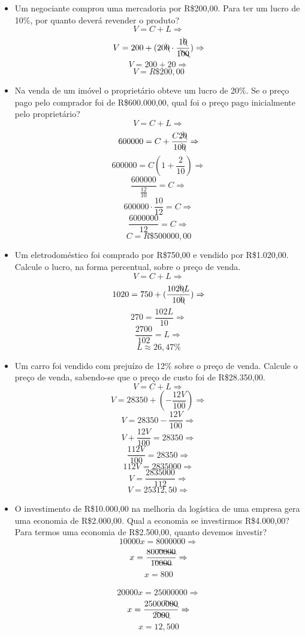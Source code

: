 \documentclass[a4paper, 12pt]{article}
\begin{document}
\begin{itemize}
\item Um negociante comprou uma mercadoria por R\$200,00. Para ter um lucro de 10\%, por quanto deverá revender o produto? \\
  $$ V = C + L \Rightarrow $$
  $$ V = 200 + (20\bcancel{0} \cdot \frac{1\bcancel{0}}{1\bcancel{00}}) \Rightarrow $$
  $$ V = 200 + 20 \Rightarrow $$
  $$ \boxed{V = R\$200,00} $$    
\item Na venda de um imóvel o proprietário obteve um lucro de 20\%. Se o preço pago pelo comprador foi de R\$600.000,00, qual foi o preço pago inicialmente pelo proprietário? \\
  $$ V = C + L \Rightarrow $$
  $$ 600000 = C + \frac{C2\bcancel{0}}{10\bcancel{0}} \Rightarrow $$  
  $$ 600000 = C \left( 1+\frac{2}{10} \right) \Rightarrow $$
  $$ \frac{600000}{\frac{12}{10}} = C \Rightarrow $$
  $$ 600000 \cdot \frac{10}{12} = C \Rightarrow $$
  $$ \frac{6000000}{12} = C \Rightarrow $$
  $$ \boxed{C = R\$500000,00} $$    
  
\item Um eletrodoméstico foi comprado por R\$750,00 e vendido por R\$1.020,00. Calcule o lucro, na forma percentual, sobre o preço de venda. \\
  $$ V = C + L \Rightarrow $$
  $$ 1020 = 750 + (\frac{102\bcancel{0}L}{10\bcancel{0}}) \Rightarrow $$
  $$ 270 = \frac{102L}{10} \Rightarrow $$
  $$ \frac{2700}{102} = L \Rightarrow $$  
  $$ \boxed{L \approx 26,47\%} $$    
  
\item Um carro foi vendido com prejuízo de 12\% sobre o preço de venda. Calcule o preço de venda, sabendo-se que o preço de custo foi de R\$28.350,00. \\
  $$ V = C + L \Rightarrow $$
  $$ V = 28350 + \left(- \frac{12V}{100} \right) \Rightarrow $$
  $$ V = 28350 - \frac{12V}{100} \Rightarrow $$
  $$ V + \frac{12V}{100} = 28350 \Rightarrow $$
  $$ \frac{112V}{100} = 28350 \Rightarrow $$
  $$ 112V = 2835000 \Rightarrow $$
  $$ V = \frac{2835000}{112} \Rightarrow $$
  $$ \boxed{V = 25312,50} \Rightarrow $$            
 
\item O investimento de R\$10.000,00 na melhoria da logística de uma empresa gera uma economia de R\$2.000,00. Qual a economia se investirmos R\$4.000,00? Para termos uma economia de R\$2.500,00, quanto devemos investir? \\
  $$ 10000x = 8000000 \Rightarrow $$
  $$ x = \frac{800\bcancel{0000}}{1\bcancel{0000}} \Rightarrow $$
  $$ \boxed{x = 800}  $$
  \\
  $$ 20000x = 25000000 \Rightarrow $$
  $$ x = \frac{25000\bcancel{000}}{2\bcancel{000}} \Rightarrow $$
  $$ \boxed{x = 12,500}  $$

    
\end{itemize}
\end{document}
